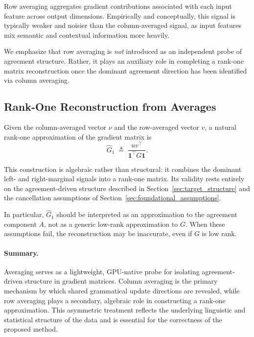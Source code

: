 Row averaging aggregates gradient contributions associated with each input feature
across output dimensions.
Empirically and conceptually, this signal is typically weaker and noisier than the
column-averaged signal, as input features mix semantic and contextual information
more heavily.

We emphasize that row averaging is \emph{not} introduced as an independent probe of
agreement structure.
Rather, it plays an auxiliary role in completing a rank-one matrix reconstruction
once the dominant agreement direction has been identified via column averaging.

\subsection{Rank-One Reconstruction from Averages}
\label{sec:rank_one_from_averages}

Given the column-averaged vector $\nu$ and the row-averaged vector $v$, a natural
rank-one approximation of the gradient matrix is
\[
\widehat{G}_1
\;\triangleq\;
\frac{u v^\top}{\mathbf{1}^\top G \mathbf{1}}.
\]

This construction is algebraic rather than structural: it combines the dominant
left- and right-marginal signals into a rank-one matrix.
Its validity rests entirely on the agreement-driven structure described in
Section~\ref{sec:target_structure} and the cancellation assumptions of
Section~\ref{sec:foundational_assumptions}.

In particular, $\widehat{G}_1$ should be interpreted as an approximation to the
agreement component $A$, not as a generic low-rank approximation to $G$.
When these assumptions fail, the reconstruction may be inaccurate, even if $G$ is
low rank.

\paragraph{Summary.}
Averaging serves as a lightweight, GPU-native probe for isolating agreement-driven
structure in gradient matrices.
Column averaging is the primary mechanism by which shared grammatical update
directions are revealed, while row averaging plays a secondary, algebraic role in
constructing a rank-one approximation.
This asymmetric treatment reflects the underlying linguistic and statistical
structure of the data and is essential for the correctness of the proposed method.